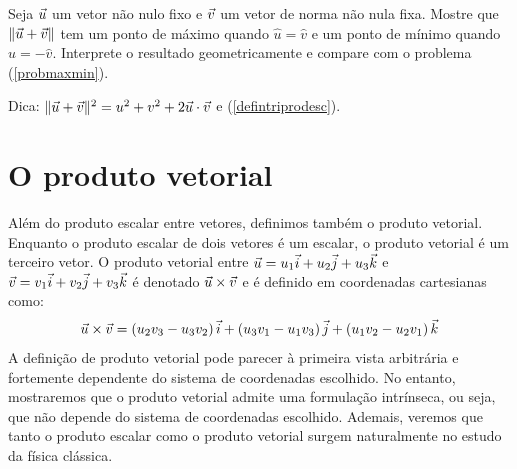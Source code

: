\begin{prob}Seja $\vec{u}$ um vetor não nulo fixo e $\vec{v}$ um vetor de norma não nula fixa. Mostre que $\|\vec{u}+\vec{v}\|$ tem um ponto de máximo quando $\hat{u}=\hat{v}$ e um ponto de mínimo quando $\hat{u}=-\hat{v}$. Interprete o resultado geometricamente e compare com o problema (\ref{probmaxmin}). 
\end{prob}
 Dica: $\|\vec{u}+\vec{v}\|^2=u^2+v^2+2\vec{u}\cdot\vec{v}$ e (\ref{defintriprodesc}).

\section{O produto vetorial}
Além do produto escalar entre vetores, definimos também o produto vetorial. Enquanto o produto escalar de dois vetores é um escalar, o produto vetorial é um terceiro vetor. O produto vetorial entre $\vec{u}=u_1\vec{i}+u_2\vec{j}+u_3\vec{k}$ e $\vec{v}=v_1\vec{i}+v_2\vec{j}+v_3\vec{k}$ é denotado $\vec{u}\times\vec{v}$ e é definido em coordenadas cartesianas como:
\begin{equation}\label{defprodvec} \vec{u}\times\vec{v}=\left(u_2v_3-u_3v_2\right)\vec{i}+\left(u_3v_1-u_1v_3\right)\vec{j}+\left(u_1v_2-u_2v_1\right)\vec{k}
\end{equation}
A definição de produto vetorial pode parecer à primeira vista arbitrária e fortemente dependente do sistema de coordenadas escolhido. No entanto, mostraremos que  o produto vetorial admite uma formulação intrínseca, ou seja, que não depende do sistema de coordenadas escolhido. Ademais, veremos que tanto o produto escalar como o produto vetorial surgem naturalmente no estudo da física clássica.


